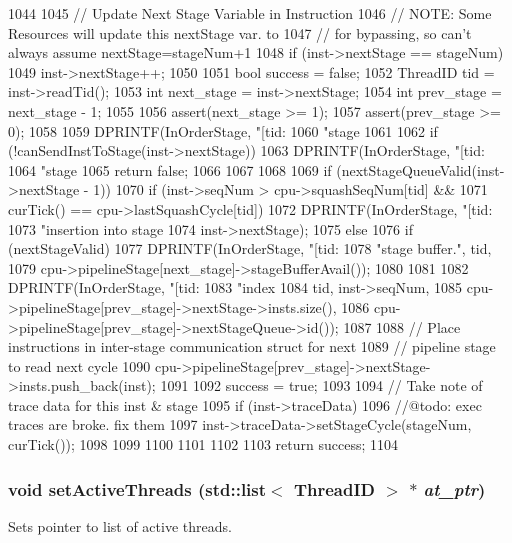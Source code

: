 \begin{DoxyCode}
1044 {
1045     // Update Next Stage Variable in Instruction
1046     // NOTE: Some Resources will update this nextStage var. to
1047     // for bypassing, so can't always assume nextStage=stageNum+1
1048     if (inst->nextStage == stageNum)
1049         inst->nextStage++;
1050 
1051     bool success = false;
1052     ThreadID tid = inst->readTid();
1053     int next_stage = inst->nextStage;
1054     int prev_stage = next_stage - 1;
1055 
1056     assert(next_stage >= 1);
1057     assert(prev_stage >= 0);
1058 
1059     DPRINTF(InOrderStage, "[tid:%
1060             "stage %
1061 
1062     if (!canSendInstToStage(inst->nextStage)) {
1063         DPRINTF(InOrderStage, "[tid:%
1064                 "stage %
1065         return false;
1066     }
1067 
1068 
1069     if (nextStageQueueValid(inst->nextStage - 1)) {
1070         if (inst->seqNum > cpu->squashSeqNum[tid] &&
1071             curTick() == cpu->lastSquashCycle[tid]) {
1072             DPRINTF(InOrderStage, "[tid:%
1073                     "insertion into stage %
1074                     inst->nextStage);
1075         } else {
1076             if (nextStageValid) {
1077                 DPRINTF(InOrderStage, "[tid:%
1078                         "stage buffer.\n", tid, 
1079                         cpu->pipelineStage[next_stage]->stageBufferAvail());
1080             }
1081 
1082             DPRINTF(InOrderStage, "[tid:%
1083                     "index %
1084                     tid, inst->seqNum,
1085                     cpu->pipelineStage[prev_stage]->nextStage->insts.size(),
1086                     cpu->pipelineStage[prev_stage]->nextStageQueue->id());
1087 
1088             // Place instructions in inter-stage communication struct for next
1089             // pipeline stage to read next cycle
1090             cpu->pipelineStage[prev_stage]->nextStage->insts.push_back(inst);
1091 
1092             success = true;
1093 
1094             // Take note of trace data for this inst & stage
1095             if (inst->traceData) {
1096                 //@todo: exec traces are broke. fix them
1097                 inst->traceData->setStageCycle(stageNum, curTick());
1098             }
1099 
1100         }
1101     }
1102 
1103     return success;
1104 }
\end{DoxyCode}
\hypertarget{classPipelineStage_aab96bdacf8bd420402cbb543f994e054}{
\subsubsection[{setActiveThreads}]{\setlength{\rightskip}{0pt plus 5cm}void setActiveThreads ({\bf std::list}$<$ {\bf ThreadID} $>$ $\ast$ {\em at\_\-ptr})}}
\label{classPipelineStage_aab96bdacf8bd420402cbb543f994e054}
Sets pointer to list of active threads. 


